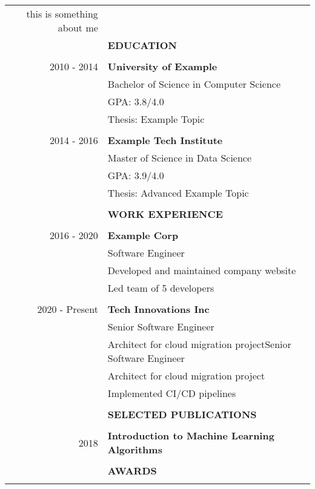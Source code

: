 \documentclass[11pt]{article}
\newcommand{\largespace}{\\[2pt]}
\newcommand{\mediumspace}{\\[-3pt]}
\newcommand{\smallspace}{\\[-5pt]}
\newcommand{\titlefont}[1]{\uppercase{\textbf{\Large{#1}}}}
\begin{document}
\begin{tcbposter}[
    poster = {columns=1, rows=1, spacing=0pt},
    boxes = {sharp corners, halign=center, valign=center, boxrule=0pt}
]
{\begin{tabular}{>{\footnotesize}rl}
        this is something about me\\
        & \titlefont{Education} \\
        \hline \mediumspace
        
        2010 - 2014
    & \textbf{University of Example} \\
    & Bachelor of Science in Computer Science \\
    & GPA: 3.8/4.0 \\
    & Thesis: Example Topic \\
    & \smallspace

2014 - 2016
    & \textbf{Example Tech Institute} \\
    & Master of Science in Data Science \\
    & GPA: 3.9/4.0 \\
    & Thesis: Advanced Example Topic \\
    & \smallspace


        
        & \titlefont{Work Experience} \\
        \hline \mediumspace
        
        2016 - 2020
    & \textbf{Example Corp} \\
    & Software Engineer \\
    & Developed and maintained company website \\
    & Led team of 5 developers \\
    & \smallspace

2020 - Present
    & \textbf{Tech Innovations Inc} \\
    & Senior Software Engineer \\
    & Architect for cloud migration projectSenior Software Engineer \\
    & Architect for cloud migration project \\
    & Implemented CI/CD pipelines \\
    & \smallspace


        
        & \titlefont{Selected Publications} \\
        \hline \mediumspace
        
        2018
    & \textbf{Introduction to Machine Learning Algorithms} \\
    & \largespace


        
        & \titlefont{Awards} \\
        \hline \mediumspace
        

\end{tabular}}
\end{tcbposter}
\end{document}
